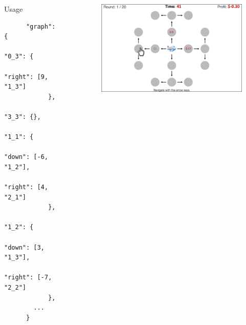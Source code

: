 \documentclass[final]{beamer}
\newlength{\sepwid}
\newlength{\onecolwid}
\newlength{\twocolwid}
\begin{document}
\begin{frame}[t]
\begin{columns}[t]
\begin{column}{\onecolwid}
  \begin{block}{Usage}\label{usage}
    \begin{verbatim}
      "graph": {
            "0_3": {
              "right": [9, "1_3"]
            },
            "3_3": {},
            "1_1": {
              "down": [-6, "1_2"],
              "right": [4, "2_1"]
            },
            "1_2": {
              "down": [3, "1_3"],
              "right": [-7, "2_2"]
            },
        ...
      }
    \end{verbatim}
  \end{block}

\end{column} %

\begin{column}{\sepwid}\end{column} %
\begin{column}{\twocolwid} %

  \begin{figure}
    \includegraphics[width=0.9\linewidth]{figs/paradigm_illustration1.png}
  \end{figure}


  \begin{columns}[t,totalwidth=\twocolwid] %
    
    \begin{column}{\onecolwid} %
      

\end{column}
\end{columns}
\end{column}
\end{columns}
\end{frame}
\end{document}
